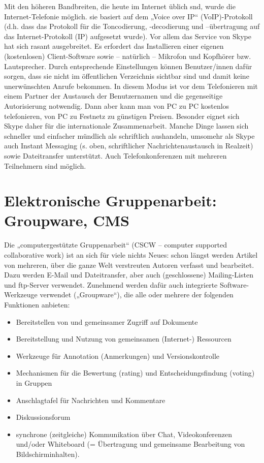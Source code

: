 \documentclass[]{book}
\providecommand{\tightlist}{%
  \setlength{\itemsep}{0pt}\setlength{\parskip}{0pt}}
\theoremstyle{definition}
\theoremstyle{definition}
\theoremstyle{definition}
\theoremstyle{remark}
\begin{document}
Mit den höheren Bandbreiten, die heute im Internet üblich snd, wurde die
Internet-Telefonie möglich. sie basiert auf dem „Voice over IP``
(VoIP)-Protokoll (d.h. dass das Protokoll für die Toncodierung,
-decodierung und --übertragung auf das Internet-Protokoll (IP)
aufgesetzt wurde). Vor allem das Service von Skype hat sich rasant
ausgebreitet. Es erfordert das Installieren einer eigenen (kostenlosen)
Client-Software sowie -- natürlich -- Mikrofon und Kopfhörer bzw.
Lautsprecher. Durch entsprechende Einstellungen können Benutzer/innen
dafür sorgen, dass sie nicht im öffentlichen Verzeichnis sichtbar sind
und damit keine unerwünschten Anrufe bekommen. In diesem Modus ist vor
dem Telefonieren mit einem Partner der Austausch der Benutzernamen und
die gegenseitige Autorisierung notwendig. Dann aber kann man von PC zu
PC kostenlos telefonieren, von PC zu Festnetz zu günstigen Preisen.
Besonder eignet sich Skype daher für die internationale Zusammenarbeit.
Manche Dinge lassen sich schneller und einfacher mündlich als
schriftlich aushandeln, umsomehr als Skype auch Instant Messaging (s.
oben, schriftlicher Nachrichtenaustausch in Realzeit) sowie
Dateitransfer unterstützt. Auch Telefonkonferenzen mit mehreren
Teilnehmern sind möglich.

\section{Elektronische Gruppenarbeit: Groupware,
CMS}\label{elektronische-gruppenarbeit-groupware-cms}

Die „computergestützte Gruppenarbeit`` (CSCW -- computer supported
collaborative work) ist an sich für viele nichts Neues: schon längst
werden Artikel von mehreren, über die ganze Welt verstreuten Autoren
verfasst und bearbeitet. Dazu werden E-Mail und Dateitransfer, aber auch
(geschlossene) Mailing-Listen und ftp-Server verwendet. Zunehmend werden
dafür auch integrierte Software-Werkzeuge verwendet („Groupware``), die
alle oder mehrere der folgenden Funktionen anbieten:

\begin{itemize}
\tightlist
\item
  Bereitstellen von und gemeinsamer Zugriff auf Dokumente
\item
  Bereitstellung und Nutzung von gemeinsamen (Internet-) Ressourcen
\item
  Werkzeuge für Annotation (Anmerkungen) und Versionskontrolle
\item
  Mechanismen für die Bewertung (rating) und Entscheidungsfindung
  (voting) in Gruppen
\item
  Anschlagtafel für Nachrichten und Kommentare
\item
  Diskussionsforum
\item
  synchrone (zeitgleiche) Kommunikation über Chat, Videokonferenzen
  und/oder Whiteboard (= Übertragung und gemeinsame Bearbeitung von
  Bildschirminhalten).
\end{itemize}
\end{document}
